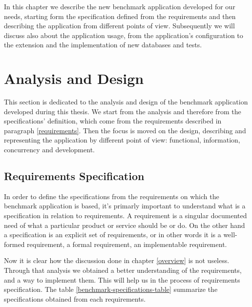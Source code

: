 In this chapter we describe the new benchmark application developed for our needs, starting form the specification defined from the requirements and then describing the application from different points of view. Subsequently we will discuss also about the application usage, from the application's configuration to the extension and the implementation of new databases and tests.

	\section{Analysis and Design}
This section is dedicated to the analysis and design of the benchmark application developed during this thesis. We start from the analysis and therefore from the specifications' definition, which come from the requirements described in paragraph \ref{requirements}. Then the focus is moved on the design, describing and representing the application by different point of view: functional, information, concurrency and development.
	
	
		\subsection{Requirements Specification} %
In order to define the specifications from the requirements on which the benchmark application is based, it's primarly important to understand what is a specification in relation to requirements. A requirement is a singular documented need of what a particular product or service should be or do. On the other hand a specification is an explicit set of requirements, or in other words it is a well-formed requirement, a formal requirement, an implementable requirement. 

Now it is clear how the discussion done in chapter \ref{overview} is not useless. Through that analysis we obtained a better understanding of the requirements, and a way to implement them. This will help us in the process of requirements specification. The table \ref{benchmark-specifications-table} summarize the specifications obtained from each requirements. 

